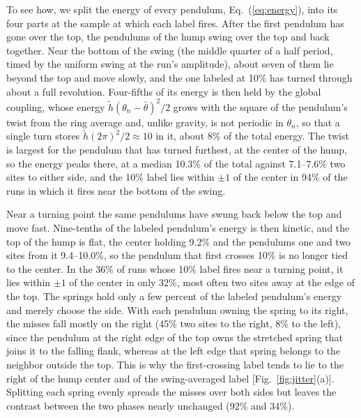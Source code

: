 \documentclass[11pt]{article}
\newcommand{\htl}{\tilde h}
\begin{document}
To see how, we split the energy of every pendulum, Eq.~(\ref{eq:energy}), into its four parts at the sample at which each label fires. After the first pendulum has gone over the top, the pendulums of the hump swing over the top and back together. Near the bottom of the swing (the middle quarter of a half period, timed by the uniform swing at the run's amplitude), about seven of them lie beyond the top and move slowly, and the one labeled at 10\% has turned through about a full revolution. Four-fifths of its energy is then held by the global coupling, whose energy $\htl(\theta_n-\bar\theta)^2/2$ grows with the square of the pendulum's twist from the ring average and, unlike gravity, is not periodic in $\theta_n$, so that a single turn stores $\htl(2\pi)^2/2\approx10$ in it, about 8\% of the total energy. The twist is largest for the pendulum that has turned furthest, at the center of the hump, so the energy peaks there, at a median 10.3\% of the total against 7.1--7.6\% two sites to either side, and the 10\% label lies within $\pm1$ of the center in 94\% of the runs in which it fires near the bottom of the swing.

Near a turning point the same pendulums have swung back below the top and move fast. Nine-tenths of the labeled pendulum's energy is then kinetic, and the top of the hump is flat, the center holding 9.2\% and the pendulums one and two sites from it 9.4--10.0\%, so the pendulum that first crosses 10\% is no longer tied to the center. In the 36\% of runs whose 10\% label fires near a turning point, it lies within $\pm1$ of the center in only 32\%, most often two sites away at the edge of the top. The springs hold only a few percent of the labeled pendulum's energy and merely choose the side. With each pendulum owning the spring to its right, the misses fall mostly on the right (45\% two sites to the right, 8\% to the left), since the pendulum at the right edge of the top owns the stretched spring that joins it to the falling flank, whereas at the left edge that spring belongs to the neighbor outside the top. This is why the first-crossing label tends to lie to the right of the hump center and of the swing-averaged label [Fig.~\ref{fig:jitter}(a)]. Splitting each spring evenly spreads the misses over both sides but leaves the contrast between the two phases nearly unchanged (92\% and 34\%).
\end{document}
